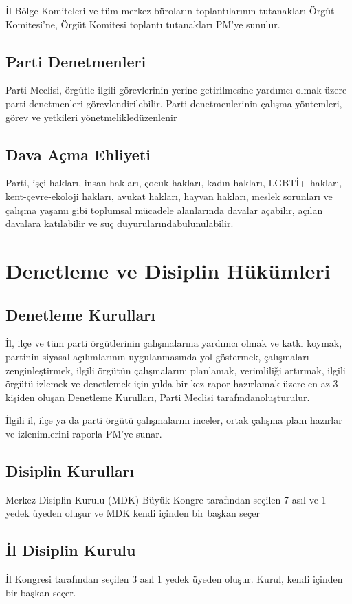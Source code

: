 \documentclass[11pt]{article} %
\begin{document}
İl-Bölge Komiteleri ve tüm merkez büroların toplantılarının tutanakları Örgüt Komitesi’ne, Örgüt Komitesi toplantı tutanakları PM’ye sunulur.
\subsection{Parti Denetmenleri}
Parti Meclisi, örgütle ilgili görevlerinin yerine getirilmesine yardımcı olmak üzere parti denetmenleri görevlendirilebilir. Parti denetmenlerinin çalışma yöntemleri, görev ve yetkileri yönetmelikledüzenlenir
\subsection{Dava Açma Ehliyeti}
Parti, işçi hakları, insan hakları, çocuk hakları, kadın hakları, LGBTİ+ hakları, kent-çevre-ekoloji hakları, avukat hakları, hayvan hakları, meslek sorunları ve çalışma yaşamı gibi toplumsal mücadele alanlarında davalar açabilir, açılan davalara katılabilir ve suç duyurularındabulunulabilir.

\section{Denetleme ve Disiplin Hükümleri}


\subsection{Denetleme Kurulları}
İl, ilçe ve tüm parti örgütlerinin çalışmalarına yardımcı olmak ve katkı koymak, partinin siyasal açılımlarının uygulanmasında yol göstermek, çalışmaları zenginleştirmek, ilgili örgütün çalışmalarını planlamak, verimliliǧi artırmak, ilgili örgütü izlemek ve denetlemek için yılda bir kez rapor hazırlamak üzere en az 3 kişiden oluşan Denetleme Kurulları, Parti Meclisi tarafındanoluşturulur.

İlgili il, ilçe ya da parti örgütü çalışmalarını inceler, ortak çalışma planı hazırlar ve izlenimlerini raporla PM’ye sunar.
\subsection{Disiplin Kurulları}
Merkez Disiplin Kurulu (MDK) Büyük Kongre tarafından seçilen 7 asıl ve 1 yedek üyeden oluşur ve MDK kendi içinden bir başkan seçer
\subsection{İl Disiplin Kurulu}
İl Kongresi tarafından seçilen 3 asıl 1 yedek üyeden oluşur. Kurul, kendi içinden
bir başkan seçer.
\end{document}
